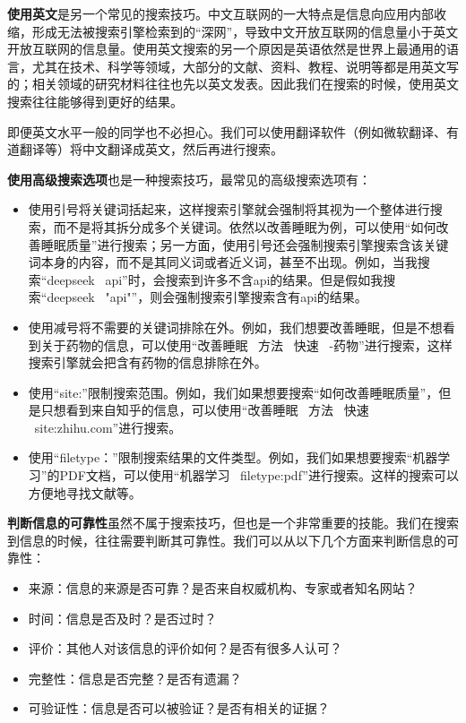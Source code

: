 \documentclass[../main.tex]{subfiles}
\begin{document}
\textbf{使用英文}是另一个常见的搜索技巧。中文互联网的一大特点是信息向应用内部收缩，形成无法被搜索引擎检索到的“深网”，导致中文开放互联网的信息量小于英文开放互联网的信息量。使用英文搜索的另一个原因是英语依然是世界上最通用的语言，尤其在技术、科学等领域，大部分的文献、资料、教程、说明等都是用英文写的；相关领域的研究材料往往也先以英文发表。因此我们在搜索的时候，使用英文搜索往往能够得到更好的结果。

即便英文水平一般的同学也不必担心。我们可以使用翻译软件（例如微软翻译、有道翻译等）将中文翻译成英文，然后再进行搜索。

\textbf{使用高级搜索选项}也是一种搜索技巧，最常见的高级搜索选项有：
\begin{itemize}
  \item 使用引号将关键词括起来，这样搜索引擎就会强制将其视为一个整体进行搜索，而不是将其拆分成多个关键词。依然以改善睡眠为例，可以使用“如何改善睡眠质量”进行搜索；另一方面，使用引号还会强制搜索引擎搜索含该关键词本身的内容，而不是其同义词或者近义词，甚至不出现。例如，当我搜索“deepseek \ api”时，会搜索到许多不含api的结果。但是假如我搜索“deepseek \ "api"”，则会强制搜索引擎搜索含有api的结果。
  \item 使用减号将不需要的关键词排除在外。例如，我们想要改善睡眠，但是不想看到关于药物的信息，可以使用“改善睡眠 \ 方法 \ 快速 \ -药物”进行搜索，这样搜索引擎就会把含有药物的信息排除在外。
  \item 使用“site:”限制搜索范围。例如，我们如果想要搜索“如何改善睡眠质量”，但是只想看到来自知乎的信息，可以使用“改善睡眠 \ 方法 \ 快速 \ site:zhihu.com”进行搜索。
  \item 使用“filetype：”限制搜索结果的文件类型。例如，我们如果想要搜索“机器学习”的PDF文档，可以使用“机器学习 \ filetype:pdf”进行搜索。这样的搜索可以方便地寻找文献等。
\end{itemize}

\textbf{判断信息的可靠性}虽然不属于搜索技巧，但也是一个非常重要的技能。我们在搜索到信息的时候，往往需要判断其可靠性。我们可以从以下几个方面来判断信息的可靠性：
\begin{itemize}
  \item 来源：信息的来源是否可靠？是否来自权威机构、专家或者知名网站？
  \item 时间：信息是否及时？是否过时？
  \item 评价：其他人对该信息的评价如何？是否有很多人认可？
  \item 完整性：信息是否完整？是否有遗漏？
  \item 可验证性：信息是否可以被验证？是否有相关的证据？
\end{itemize}
\end{document}
